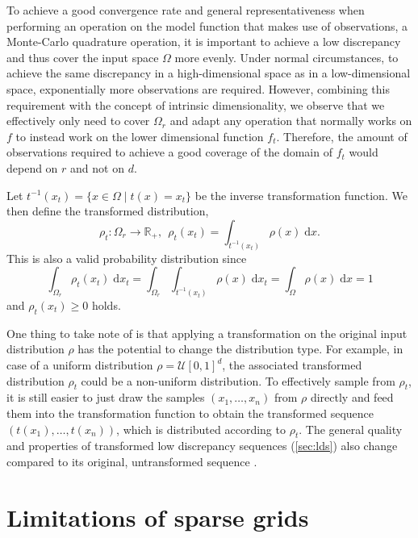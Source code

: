 \documentclass[
  a4paper,  %
  twoside,  %
  bibliography=totoc,
  headsepline,
  cleardoublepage=empty,
  parskip=half,
  draft=false
]{scrbook}
\begin{document}
To achieve a good convergence rate and general representativeness when performing an operation on the model function that makes use of observations, \eg a Monte-Carlo quadrature operation, it is important to achieve a low discrepancy and thus cover the input space $\Omega$ more evenly.
Under normal circumstances, to achieve the same discrepancy in a high-dimensional space as in a low-dimensional space,
exponentially more observations are required.
However, combining this requirement with the concept of intrinsic dimensionality, we observe that we effectively only need to cover $\Omega_r$ and adapt any operation that normally works on $f$ to instead work on the lower dimensional function $f_t$.
Therefore, the amount of observations required to achieve a good coverage of the domain of $f_t$ would depend on $r$ and not on $d$.

\begin{definition}
Let $t^{-1}(x_{t})=\{x \in \Omega \mid t(x)=x_{t}\}$ be the inverse transformation function.
We then define the transformed distribution,
\begin{equation}
\rho_t \colon \Omega_r \to \mathds{R_+}, ~~ \rho_t(x_t)=\int_{t^{-1}(x_t)} \rho(x) \; \mathrm{d}x.
\end{equation}
This is also a valid probability distribution since
\begin{equation}
\int_{\Omega_r} \rho_t(x_t) \; \mathrm{d}x_t=\int_{\Omega_r} \int_{t^{-1}(x_t)} \rho(x) \; \mathrm{d}x_t = \int_{\Omega} \rho(x) \; \mathrm{d}x = 1
\end{equation}
and $\rho_t(x_t) \geq 0$ holds.
\end{definition}
%
One thing to take note of is that applying a transformation on the original input distribution $\rho$ has the potential to change the distribution type.
For example, in case of a uniform distribution $\rho=\mathcal{U}[0,1]^d$, the associated transformed distribution $\rho_t$ could be a non-uniform distribution.
To effectively sample from $\rho_t$, it is still easier to just draw the samples $(x_1, \dots, x_n)$ from $\rho$ directly and feed them into the transformation function to obtain the transformed sequence $(t(x_1), \dots, t(x_n))$, which is distributed according to $\rho_t$.
The general quality and properties of transformed low discrepancy sequences (\cref{sec:lds}) also change compared to its original, untransformed sequence \cite{Wang2008}.

\section{Limitations of sparse grids}
\end{document}
